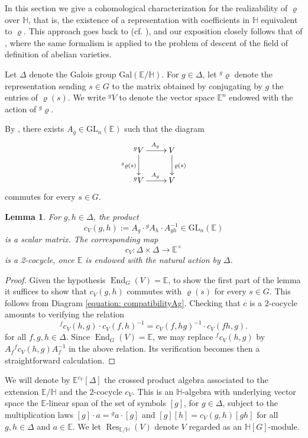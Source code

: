 \documentclass[oneside]{amsart}
\newtheorem{lemma}[theorem]{Lemma}
\theoremstyle{remark}
\newcommand{\Gal}{\mathrm{Gal}}
\newcommand{\GL}{\mathrm{GL}}
\newcommand{\End}{\operatorname{End}}
\newcommand{\Res}{\operatorname{Res}}
\newcommand{\Hg}{\mathbb{H}}
\newcommand{\Eg}{\mathbb{E}}
\numberwithin{equation}{section}
\begin{document}
In this section we give a cohomological characterization for the realizability of $\varrho$ over $\Hg$, that is, the existence of a representation with coefficients in $\Hg$ equivalent to $\varrho$. This approach goes back to \cite{Sch04} (cf. \cite{Nek12}), and our exposition closely follows that of \cite[\S6,\S8]{Rib92}, where the same formalism is applied to the problem of descent of the field of definition of abelian varieties. 


Let $\Delta$ denote the Galois group $\Gal(\Eg/\Hg)$. For $g\in \Delta$, let ${}^g\varrho$ denote the representation sending $s\in G$ to the matrix obtained by conjugating by $g$ the entries of $\varrho(s)$. We write ${}^gV$ to denote the vector space $\Eg^n$ endowed with the action of ${}^g\varrho$.

By \cite[Ch. 8,\S21, n.1, Prop. 1]{Bou12}, there exists $A_g\in \GL_n(\Eg)$ such that
the diagram
\begin{equation}\label{equation: compatibilityAg}
\xymatrix{
{}^g V \ar[d]_{{}^g\varrho(s)} \ar[r]^{A_g} & V \ar[d]^{\varrho(s)}\\
{}^g V \ar[r]^{A_g} & V}
\end{equation}
 commutes for every $s\in G$.
\begin{lemma}
For $g,h\in \Delta$, the product 
\begin{equation}\label{equation: def c_V}
c_V(g,h):=A_g\cdot {}^{g}A_h\cdot  A_{gh}^{-1} \in \GL_n(\Eg)
\end{equation} 
is a scalar matrix. The corresponding map
$$
c_V: \Delta \times \Delta \rightarrow \Eg^\times 
$$
is a 2-cocycle, once $\Eg$ is endowed with the natural action by $\Delta$.
\end{lemma}

\begin{proof}
Given the hypothesis $\End_G(V)=\Eg$, to show the first part of the lemma it suffices to show that $c_V(g,h)$ commutes with $\varrho(s)$ for every $s\in G$. This follows from Diagram \eqref{equation: compatibilityAg}. Checking that $c$ is a $2$-cocycle amounts to verifying the relation
$$
{}^fc_V(h,g)\cdot c_V(f,h)^{-1}=c_V(f,hg)^{-1}\cdot c_V(fh,g).
$$
for all $f,g,h\in \Delta$. Since $\End_G(V)=\Eg$, we may replace ${}^fc_V(h,g)$ by $A_f{}^fc_V(h,g)A_f^{-1}$ in the above relation. Its verification becomes then a straightforward calculation. 
\end{proof}

We will denote by $\Eg^{c_V}[\Delta]$ the crossed product algebra associated to the extension $\Eg/\Hg$ and the $2$-cocycle $c_V$. This is an $\Hg$-algebra with underlying vector space the $\Eg$-linear span of the set of symbols $[g]$, for $g\in\Delta$, subject to the multiplication laws $[g]\cdot a={}^ga\cdot [g]$ and $[g][h]=c_V(g,h)[gh]$ for all $g,h\in \Delta$ and $a\in \Eg$. We let $\Res_{\Eg/\Hg}(V)$ denote $V$ regarded as an $\Hg[G]$-module. 
 
\end{document}
